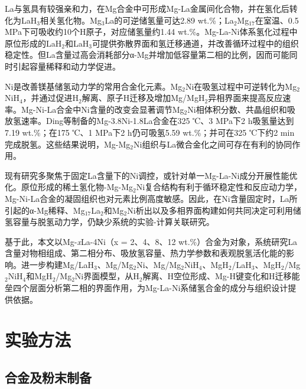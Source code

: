 \documentclass[preprint,12pt]{elsarticle}
\begin{document}
La与氢具有较强亲和力，在Mg合金中可形成Mg-La金属间化合物，并在氢化后转化为LaH$_{\mathrm{3}}$相关氢化物。Mg$_{\mathrm{3}}$La的可逆储氢量可达2.89 wt.\%\cite{ref5}；La$_{\mathrm{2}}$Mg$_{\mathrm{17}}$在室温、0.5 MPa下可吸收约10个H原子，对应储氢量约1.44 wt.\%\cite{ref6}。Mg-La-Ni体系氢化过程中原位形成的LaH$_{\mathrm{2}}$和LaH$_{\mathrm{3}}$可提供弥散界面和氢迁移通道，并改善循环过程中的组织稳定性\cite{ref7,ref8}。但La含量过高会消耗部分α-Mg并增加低容量第二相的比例，因而可能同时引起容量稀释和动力学促进。

Ni是改善镁基储氢动力学的常用合金化元素。Mg$_{\mathrm{2}}$Ni在吸氢过程中可逆转化为Mg$_{\mathrm{2}}$NiH$_{\mathrm{4}}$\cite{ref9}，并通过促进H$_{\mathrm{2}}$解离、原子H迁移及增加Mg/MgH$_{\mathrm{2}}$异相界面来提高反应速率\cite{ref10}。Mg-Ni-La合金中Ni含量的改变会显著调节Mg$_{\mathrm{2}}$Ni相体积分数、共晶组织和吸放氢速率\cite{ref11,ref12}。Ding等制备的Mg-3.8Ni-1.8La合金在325 ℃、3 MPa下2 h吸氢量达到7.19 wt.\%；在175 ℃、1 MPa下2 h仍可吸氢5.59 wt.\%；并可在325 ℃下约2 min完成脱氢\cite{ref13}。这些结果说明，Mg-Mg$_{\mathrm{2}}$Ni组织与La微合金化之间可存在有利的协同作用\cite{ref13,ref14}。

现有研究多聚焦于固定La含量下的Ni调控，或针对单一Mg-La-Ni成分开展性能优化。原位形成的稀土氢化物-Mg-Mg$_{\mathrm{2}}$Ni复合结构有利于循环稳定性和反应动力学\cite{ref15}，Mg-Ni-La合金的凝固组织也对元素比例高度敏感\cite{ref16,ref17}。因此，在Ni含量固定时，La所引起的α-Mg稀释、Mg$_{\mathrm{17}}$La$_{\mathrm{2}}$和Mg$_{\mathrm{2}}$Ni析出以及多相界面构建如何共同决定可利用储氢容量与脱氢动力学，仍缺少系统的实验-计算关联研究。

基于此，本文以Mg-\textit{x}La-4Ni（x = 2、4、8、12 wt.\%）合金为对象，系统研究La含量对物相组成、第二相分布、吸放氢容量、热力学参数和表观脱氢活化能的影响。进一步构建Mg/LaH$_{\mathrm{3}}$、Mg/Mg$_{\mathrm{2}}$Ni、Mg/Mg$_{\mathrm{2}}$NiH$_{\mathrm{4}}$、MgH$_{\mathrm{2}}$/LaH$_{\mathrm{3}}$、MgH$_{\mathrm{2}}$/Mg$_{\mathrm{2}}$NiH$_{\mathrm{4}}$和MgH$_{\mathrm{2}}$/Mg$_{\mathrm{2}}$Ni界面模型，从H$_{\mathrm{2}}$解离、H空位形成、Mg-H键变化和H迁移能垒四个层面分析第二相的界面作用，为Mg-La-Ni系储氢合金的成分与组织设计提供依据。

\section{实验方法}

\subsection{合金及粉末制备}
\end{document}
